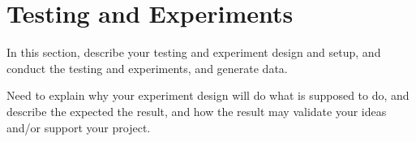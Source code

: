 \section{Testing and Experiments}
In this section, describe your testing and experiment design and setup, and conduct the testing and experiments, and generate data. 

Need to explain why your experiment design will do what is supposed to do, and describe the expected the result, and how the result may validate your ideas and/or support your project. 